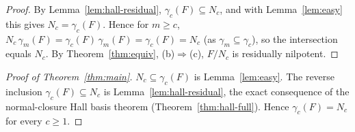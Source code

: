 \documentclass{amsart}
\theoremstyle{definition}
\theoremstyle{remark}
\begin{document}
\begin{proof}
By Lemma~\ref{lem:hall-residual}, $\gamma_c(F)\subseteq N_c$, and with
Lemma~\ref{lem:easy} this gives $N_c=\gamma_c(F)$. Hence for $m\ge c$,
$N_c\,\gamma_m(F)=\gamma_c(F)\,\gamma_m(F)=\gamma_c(F)=N_c$ (as
$\gamma_m\subseteq\gamma_c$), so the intersection equals $N_c$. By
Theorem~\ref{thm:equiv}, (b)$\Rightarrow$(c), $F/N_c$ is residually nilpotent.
\end{proof}

\begin{proof}[Proof of Theorem~\ref{thm:main}]
$N_c\subseteq\gamma_c(F)$ is Lemma~\ref{lem:easy}. The reverse inclusion
$\gamma_c(F)\subseteq N_c$ is Lemma~\ref{lem:hall-residual}, the exact consequence
of the normal-closure Hall basis theorem (Theorem~\ref{thm:hall-full}). Hence
$\gamma_c(F)=N_c$ for every $c\ge1$.
\end{proof}
\end{document}
